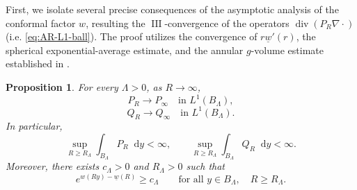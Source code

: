\documentclass[12pt]{amsart}
\theoremstyle{plain}
\newtheorem{proposition}[theorem]{Proposition}
\theoremstyle{definition}
\theoremstyle{remark}     %
\numberwithin{equation}{section}
\newcommand{\dd}{\mathop{}\!\mathrm{d}}%
\begin{document}
{First, we isolate several precise consequences of the asymptotic analysis of the conformal factor $w$, resulting the $\operatorname{III}$-convergence of the operators $\operatorname{div}(P_R\nabla\cdot)$ (i.e. \cref{eq:AR-L1-ball}).}
The proof utilizes the convergence of
$r\underline w'(r)$, the spherical exponential-average estimate, and the
annular $g$-volume estimate established in \cite{M}.
\begin{proposition}
\label{prop:weight-convergence}
For every $\Lambda>0$, as $R\to\infty$,
\begin{equation}\label{eq:AR-L1-ball}
    P_R\to P_\infty
    \quad\text{in }L^1(B_\Lambda),
\end{equation}
\begin{equation}\label{eq:BR-L1-ball}
    Q_R\to Q_\infty
    \quad\text{in }L^1(B_\Lambda).
\end{equation}
In particular, 
\[
    \sup_{R\geq R_\Lambda}\int_{B_\Lambda}P_R\dd y<\infty,
    \qquad
    \sup_{R\geq R_\Lambda}\int_{B_\Lambda}Q_R\dd y<\infty.
\]
Moreover, there exists $c_\Lambda>0$ and $R_\Lambda>0$ such that
\begin{equation}\label{eq:conformal-lower-bound}
    e^{w(Ry)-\underline w(R)}\geq c_\Lambda
    \qquad\text{for all }y\in B_\Lambda,
    \quad R\geq R_\Lambda.
\end{equation}
\end{proposition}
\end{document}
